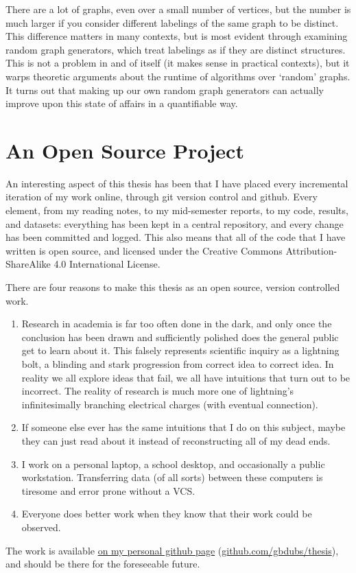 There are a lot of graphs, even over a small number of vertices, but the number is much larger if you consider different labelings of the same graph to be distinct.
This difference matters in many contexts, but is most evident through examining random graph generators, which treat labelings as if they are distinct structures. 
This is not a problem in and of itself (it makes sense in practical contexts), but it warps theoretic arguments about the runtime of algorithms over `random' graphs.
It turns out that making up our own random graph generators can actually improve upon this state of affairs in a quantifiable way.

\chapter*{An Open Source Project}

An interesting aspect of this thesis has been that I have placed every incremental iteration of my work online, through git version control and github.
Every element, from my reading notes, to my mid-semester reports, to my code, results, and datasets: everything has been kept in a central repository, and every change has been committed and logged.
This also means that all of the code that I have written is open source, and licensed under the Creative Commons Attribution-ShareAlike 4.0 International License.

There are four reasons to make this thesis as an open source, version controlled work.
\begin{enumerate}
\item{
Research in academia is far too often done in the dark, and only once the conclusion has been drawn and sufficiently polished does the general public get to learn about it. 
This falsely represents scientific inquiry as a lightning bolt, a blinding and stark progression from correct idea to correct idea. 
In reality we all explore ideas that fail, we all have intuitions that turn out to be incorrect.
The reality of research is much more one of lightning's infinitesimally branching electrical charges (with eventual connection).
}
\item{If someone else ever has the same intuitions that I do on this subject, maybe they can just read about it instead of reconstructing all of my dead ends.}
\item{I work on a personal laptop, a school desktop, and occasionally a public workstation. Transferring data (of all sorts) between these computers is tiresome and error prone without a VCS.}
\item{Everyone does better work when they know that their work could be observed.}
\end{enumerate}

The work is available \href{http://www.github.com/gbdubs/thesis}{on my personal github page} (\href{http://www.github.com/gbdubs/thesis}{github.com/gbdubs/thesis}), and should be there for the foreseeable future.